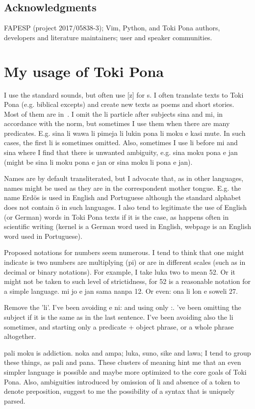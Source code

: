 \documentclass{article}
\begin{document}
\subsection*{Acknowledgments}
FAPESP (project 2017/05838-3);
Vim, Python, and Toki Pona authors, developers and literature maintainers;
user and speaker communities. 

\appendix
\section{My usage of Toki Pona}\label{mytoki}

I use the standard sounds, but often use [z] for s.
I often translate texts to Toki Pona (e.g. biblical excepts)
and create new texts as poems and short stories.
Most of them are in~\cite{tokisona}.
I omit the li particle after subjects sina and mi,
in accordance with the norm,
but sometimes I use them when there are many predicates.
E.g. sina li wawa li pimeja li lukin pona li moku e kasi mute.
In such cases, the first li is sometimes omitted.
Also, sometimes I use li before mi and sina where I find
that there is unwanted ambiguity, e.g.
sina moku pona e jan 
(might be sina li moku pona e jan or sina moku li pona e jan).

Names are by default transliterated,
but I advocate that, as in other languages,
names might be used as they are in the
correspondent mother tongue.
E.g. the name Erdös is used in
English and Portuguese although the standard
alphabet does not contain ö in such languages.
I also tend to legitimate the use of English (or German) words
in Toki Pona texts if it is the case,
as happens often in scientific writing
(kernel is a German word used in English,
webpage is an English word used in Portuguese).

Proposed notations for numbers seem numerous.
I tend to think that one might indicate is two numbers
are multiplying (pi) or are in different scales
(such as in decimal or binary notations).
For example, I take luka two to mean 52.
Or it might not be taken to such level of strictidness,
for 52 is a reasonable notation for a simple language.
mi jo e jan sama nanpa 12.
Or even:
ona li lon e soweli 27.

Remove the 'li'.
I've been avoiding e ni: and using only :.
've been omitting the subject if it is the
same as in the last sentence.
I've been avoiding also the li sometimes,
and starting only a predicate + object phrase,
or a whole phrase altogether.

pali moku is addiction.
noka and ampa; luka, suno, sike and lawa;
I tend to group these things, as pali and pana.
These clusters of meaning hint me that an even simpler
language is possible and maybe more optimized to the
core goals of Toki Pona.
Also, ambiguities introduced by omission of li
and absence of a token to denote preposition,
suggest to me the possibility of a syntax that is uniquely
parsed.
\end{document}
